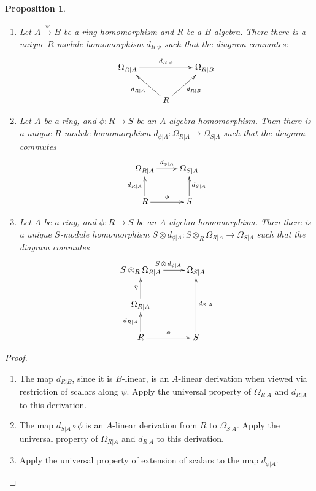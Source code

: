 \documentclass{amsart}[12pt]
\numberwithin{equation}{section}
\theoremstyle{plain} %
\newtheorem{prop}[equation]{Proposition}
\theoremstyle{definition}
\theoremstyle{remark}
\newcommand{\xra}[1]{\xrightarrow{#1}}
\begin{document}
\begin{prop}
\begin{enumerate}
\item Let $A \xra{\psi} B$ be a ring homomorphism and $R$ be a $B$-algebra. There there is a unique $R$-module homomorphism $d_{R|\psi}$ such that the diagram commutes:
\[ \xymatrix{ \Omega_{R|A} \ar[rr]^{d_{R|\psi}} & & \Omega_{R|B} \\
 &R\ar[lu]^{d_{R|A}} \ar[ur]_{d_{R|B}} & } \]

\item Let $A$ be a ring, and $\phi:R\to S$ be an $A$-algebra homomorphism. Then there is a unique $R$-module homomorphism $d_{\phi|A}:\Omega_{R|A}\to \Omega_{S|A}$ such that the diagram commutes
\[ \xymatrix{ \Omega_{R|A} \ar[r]^{d_{\phi|A}} & \Omega_{S|A} \\
R\ar[u]^{d_{R|A}} \ar[r]^{\phi} & S \ar[u]_{d_{S|A}} } \]

\item Let $A$ be a ring, and $\phi:R\to S$ be an $A$-algebra homomorphism. Then there is a unique $S$-module homomorphism $S\otimes d_{\phi|A}: S\otimes_R \Omega_{R|A}\to \Omega_{S|A}$ such that the diagram commutes
\[ \xymatrix{S\otimes_R \Omega_{R|A} \ar[r]^{S\,\otimes\, d_{\phi|A}} & \Omega_{S|A} \\
 \Omega_{R|A} \ar[u]^{\eta} & \\
R\ar[u]^{d_{R|A}} \ar[r]^{\phi} & S \ar[uu]_{d_{S|A}} } \]
\end{enumerate}
\end{prop}
\begin{proof} 
\begin{enumerate}
\item The map $d_{R|B}$, since it is $B$-linear, is an $A$-linear derivation when viewed via restriction of scalars along $\psi$. Apply the universal property of $\Omega_{R|A}$ and $d_{R|A}$ to this derivation.
\item The map $d_{S|A} \circ \phi$ is an $A$-linear derivation from $R$ to $\Omega_{S|A}$. Apply the universal property of $\Omega_{R|A}$ and $d_{R|A}$ to this derivation.
\item Apply the universal property of extension of scalars to the map $d_{\phi|A}$.\qedhere
\end{enumerate}
\end{proof}
\end{document}
